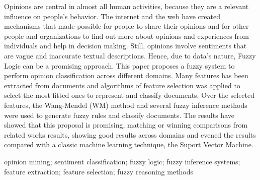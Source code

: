 \documentclass[msc, a4paper, classic, pt]{ufbathesis}
\begin{document}
\abstract
Opinions are central in almost all human activities, because they are a relevant influence on people’s behavior. The internet and the web have created mechanisms that made possible for people to share their opinions and for other people and organizations to find out more about opinions and experiences from individuals and help in decision making. Still, opinions involve sentiments that are vague and inaccurate textual descriptions. Hence, due to data's nature, Fuzzy Logic can be a promising approach. This paper proposes a fuzzy system to perform opinion classification across different domains. Many features has been extracted from documents and algorithms of feature selection was applied to select the most fitted ones to represent and classify documents. Over the selected features, the Wang-Mendel (WM) method and several fuzzy inference methods were used to generate fuzzy rules and classify documents. The results have showed that this proposal is promising, matching or winning comparisons from related works results, showing good results across domains and evened the results compared with a classic machine learning technique, the Suport Vector Machine.
\begin{keywords}
opinion mining; sentiment classification; fuzzy logic; fuzzy inference systems; feature extraction; feature selection; fuzzy reasoning methods
\end{keywords}

\tableofcontents

\listoffigures

\listoftables

\mainmatter

% 
% 
% 
%

%
%
%
%
%
%
%


\end{document}
